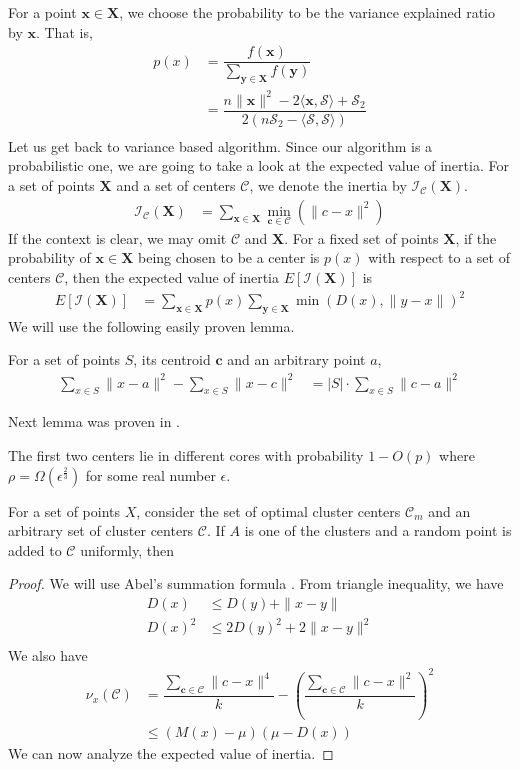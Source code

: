 \documentclass[twoside, 11pt]{article}
\newcommand{\x}{\mathbf{x}}
\newcommand{\X}{\mathbf{X}}
\newcommand{\y}{\mathbf{y}}
\renewcommand{\c}{\mathbf{c}}
\newcommand{\C}{\mathcal{C}}
\newcommand{\I}{\mathcal{I}}
\renewcommand{\S}{\mathcal{S}}
\begin{document}
	For a point $\x\in\X$, we choose the probability to be the variance explained ratio by $\x$. That is,
		\begin{align*}
			p(x) & = \dfrac{f(\x)}{\sum_{\y\in\X}f(\y)}\\
				 & = \dfrac{n\|\x\|^2-2\langle\x,\S\rangle+\S_2}{2(n\S_2-\langle\S,\S\rangle)}\\
		\end{align*}
	Let us get back to variance based algorithm. Since our algorithm is a probabilistic one, we are going to take a look at the expected value of inertia. For a set of points $\X$ and a set of centers $\C$, we denote the inertia by $\I_\C(\X)$.
		\begin{align*}
			\I_\C(\X) & = \sum_{\x\in\X}\min_{\c\in\C}(\|c-x\|^2)
		\end{align*}
	If the context is clear, we may omit $\C$ and $\X$. For a fixed set of points $\X$, if the probability of $\x\in\X$ being chosen to be a center is $p(x)$ with respect to a set of centers $\C$, then the expected value of inertia $E[\I(\X)]$ is
		\begin{align*}
			E[\I(\X)] & = \sum_{\x\in\X}p(x)\sum_{\y\in\X}\min(D(x),\|y-x\|)^2
		\end{align*}
	We will use the following easily proven lemma.
		\begin{lemma}
			For a set of points $S$, its centroid $\c$ and an arbitrary point $a$,
				\begin{align*}
					\sum_{x\in S}\| x-a\|^2-\sum_{x\in S}\| x-c\|^2 
						& = |S|\cdot\sum_{x\in S}\| c-a\|^2
				\end{align*}
		\end{lemma}
	Next lemma was proven in \cite[Lemma $3.2$]{ostrovsky}.
		\begin{lemma}
			 The first two centers lie in different cores with probability $1-O(p)$ where $\rho=\Omega(\epsilon^{\frac{2}{3}})$ for some real number $\epsilon$.
		\end{lemma}
	
		\begin{theorem}
			For a set of points $X$, consider the set of optimal cluster centers $\C_m$ and an arbitrary set of cluster centers $\C$. If $A$ is one of the clusters and a random point is added to $\C$ uniformly, then
		\end{theorem}
	
		\begin{proof}
			We will use Abel's summation formula \cite[Theorem $4.2$]{apostol}. From triangle inequality, we have
				\begin{align*}
					D(x) & \leq D(y)+\|x-y\|\\
					D(x)^2 & \leq 2D(y)^2+2\|x-y\|^2\\
				\end{align*}
			We also have
				\begin{align*}
					\nu_x(\C) & = \dfrac{\sum_{\c\in\C}\|c-x\|^4}{k}-\left(\dfrac{\sum_{\c\in\C}\|c-x\|^2}{k}\right)^2\\
							  & \leq (M(x)-\mu)(\mu-D(x))
				\end{align*}
			We can now analyze the expected value of inertia.
		\end{proof}
\end{document}
